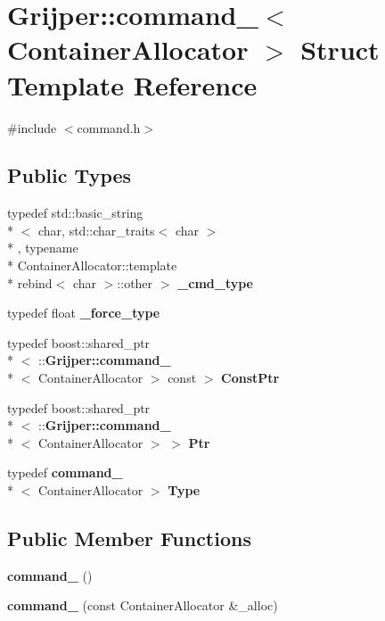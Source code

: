 \section{Grijper\-:\-:command\-\_\-$<$ Container\-Allocator $>$ Struct Template Reference}
\label{structGrijper_1_1command__}


{\ttfamily \#include $<$command.\-h$>$}

\subsection*{Public Types}
\begin{DoxyCompactItemize}
\item 
typedef std\-::basic\-\_\-string\\*
$<$ char, std\-::char\-\_\-traits$<$ char $>$\\*
, typename \\*
Container\-Allocator\-::template \\*
rebind$<$ char $>$\-::other $>$ {\bf \-\_\-cmd\-\_\-type}
\item 
typedef float {\bf \-\_\-force\-\_\-type}
\item 
typedef boost\-::shared\-\_\-ptr\\*
$<$ \-::{\bf Grijper\-::command\-\_\-}\\*
$<$ Container\-Allocator $>$ const  $>$ {\bf Const\-Ptr}
\item 
typedef boost\-::shared\-\_\-ptr\\*
$<$ \-::{\bf Grijper\-::command\-\_\-}\\*
$<$ Container\-Allocator $>$ $>$ {\bf Ptr}
\item 
typedef {\bf command\-\_\-}\\*
$<$ Container\-Allocator $>$ {\bf Type}
\end{DoxyCompactItemize}
\subsection*{Public Member Functions}
\begin{DoxyCompactItemize}
\item 
{\bf command\-\_\-} ()
\item 
{\bf command\-\_\-} (const Container\-Allocator \&\-\_\-alloc)
\end{DoxyCompactItemize}
